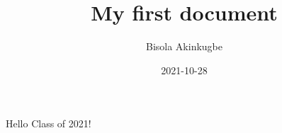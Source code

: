 \documentclass{article}
\title{My first document}
\date{2021-10-28}
\author{Bisola Akinkugbe}
\begin{document}
	\maketitle\newpage
	Hello Class of 2021!
\end{document}
